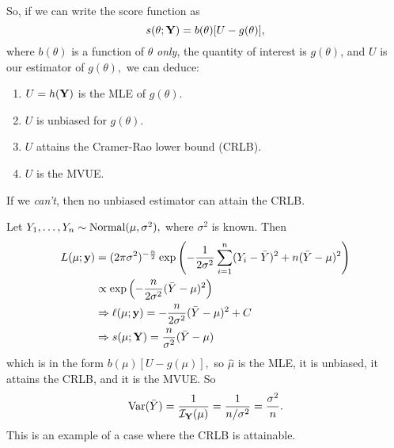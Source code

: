 So, if we can write the score function as
$$
s(\theta;\mathbf Y)=b(\theta)[U-g(\theta)],
$$
where $b(\theta)$ is a function of $\theta$ \textit{only}, the quantity of interest is $g(\theta)$, and $U$ is our estimator of $g(\theta),$ we can deduce:
\begin{enumerate}[(1)]
    \item $U=h(\mathbf Y)$ is the MLE of $g(\theta)$.
    \item $U$ is unbiased for $g(\theta).$
    \item $U$ attains the Cramer-Rao lower bound (CRLB).
    \item $U$ is the MVUE.
\end{enumerate}
If we \textit{can't}, then no unbiased estimator can attain the CRLB.

\begin{eg}
Let $Y_1,\ldots,Y_n\sim \operatorname*{Normal}(\mu,\sigma^2),$ where $\sigma^2$ is known. Then
\begin{align*}
    L(\mu;\mathbf y)&=(2\pi\sigma^2)^{-\frac{n}{2}}\exp\left(-\frac{1}{2\sigma^2}\sum^n_{i=1}(Y_i-\bar Y)^2+n(\bar Y-\mu)^2\right)\\
    &\propto \exp\left(-\frac{n}{2\sigma^2}(\bar Y-\mu)^2\right) \\
    &\Rightarrow \ell(\mu;\mathbf y)=-\frac{n}{2\sigma^2}(\bar Y-\mu)^2 +C \\
    &\Rightarrow s(\mu;\mathbf Y)=\frac{n}{\sigma^2}(\bar Y-\mu) 
\end{align*}
which is in the form $b(\mu)[U-g(\mu)],$ so $\hat \mu$ is the MLE, it is unbiased, it attains the CRLB, and it is the MVUE. So
$$
\operatorname*{Var}(\bar Y)=\frac{1}{\mathcal I_\mathbf Y(\mu)}=\frac{1}{n/\sigma^2}=\frac{\sigma^2}{n}.
$$
This is an example of a case where the CRLB is attainable.
\end{eg}
